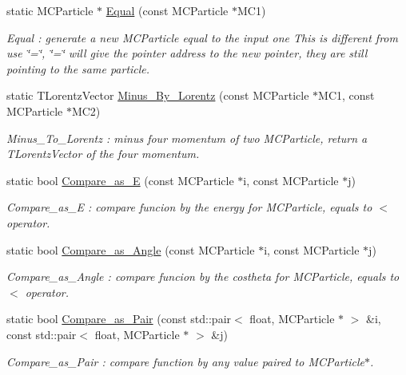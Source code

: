 \begin{DoxyCompactItemize}
static MCParticle $\ast$ \hyperlink{classToolSet_1_1CMC_a29838e430204b6f0d6e5cdf8a669f615}{Equal} (const MCParticle $\ast$MC1)
\begin{DoxyCompactList}\small\item\em Equal : generate a new MCParticle equal to the input one This is different from use \char`\"{}=\char`\"{}, \char`\"{}=\char`\"{} will give the pointer address to the new pointer, they are still pointing to the same particle. \item\end{DoxyCompactList}\item 
static TLorentzVector \hyperlink{classToolSet_1_1CMC_a5883ceda367cc5e32cbacdabdc119a4a}{Minus\_\-By\_\-Lorentz} (const MCParticle $\ast$MC1, const MCParticle $\ast$MC2)
\begin{DoxyCompactList}\small\item\em Minus\_\-To\_\-Lorentz : minus four momentum of two MCParticle, return a TLorentzVector of the four momentum. \item\end{DoxyCompactList}\item 
static bool \hyperlink{classToolSet_1_1CMC_a74a827b8a208cbf1ef83ee66b2a9dc04}{Compare\_\-as\_\-E} (const MCParticle $\ast$i, const MCParticle $\ast$j)
\begin{DoxyCompactList}\small\item\em Compare\_\-as\_\-E : compare funcion by the energy for MCParticle, equals to $<$ operator. \item\end{DoxyCompactList}\item 
static bool \hyperlink{classToolSet_1_1CMC_a4043b9e78a5178c2d8fba7f6543a7e65}{Compare\_\-as\_\-Angle} (const MCParticle $\ast$i, const MCParticle $\ast$j)
\begin{DoxyCompactList}\small\item\em Compare\_\-as\_\-Angle : compare funcion by the costheta for MCParticle, equals to $<$ operator. \item\end{DoxyCompactList}\item 
static bool \hyperlink{classToolSet_1_1CMC_a9840196a2fd81836dfc4118e68d7be38}{Compare\_\-as\_\-Pair} (const std::pair$<$ float, MCParticle $\ast$ $>$ \&i, const std::pair$<$ float, MCParticle $\ast$ $>$ \&j)
\begin{DoxyCompactList}\small\item\em Compare\_\-as\_\-Pair : compare function by any value paired to MCParticle$\ast$. \item\end{DoxyCompactList}\item 

\end{DoxyCompactItemize}
